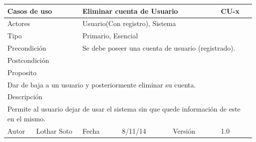 \documentclass{article}
\begin{document}
\begin{table}[h]
\begin{tabular}{|l|l|l|l|l|l|}
\hline
\multicolumn{2}{|p{2cm}|}{Casos de uso}  & \multicolumn{3}{p{7cm}|}{\textbf{Eliminar cuenta de Usuario}} & CU-x \\
\hline
\multicolumn{2}{|p{2cm}|}{Actores}       & \multicolumn{4}{p{8cm}|}{Usuario(Con registro), Sistema}        \\
\hline
\multicolumn{2}{|p{2cm}|}{Tipo}          & \multicolumn{4}{p{8cm}|}{Primario, Esencial}        \\
\hline
\multicolumn{2}{|p{2cm}|}{Precondición}  & \multicolumn{4}{p{8cm}|}{Se debe poseer una cuenta de usuario (registrado).}        \\
\hline
\multicolumn{2}{|p{2cm}|}{Postcondición} & \multicolumn{4}{p{8cm}|}{}        \\
\hline
\multicolumn{6}{|p{10cm}|}{Proposito}                                   \\
\hline
\multicolumn{6}{|p{10cm}|}{Dar de baja a un usuario y posteriormente eliminar su cuenta.}                                            \\
\hline
\multicolumn{6}{|p{10cm}|}{Descripción}                                 \\
\hline
\multicolumn{6}{|p{10cm}|}{Permite al usuario dejar de usar el sistema sin que quede información de este en el mismo.}                                            \\
\hline
Autor          &       Lothar Soto        & Fecha    &  8/11/14   &   Versión  & 1.0\\     
\hline
\end{tabular}
\end{table}
\end{document}
